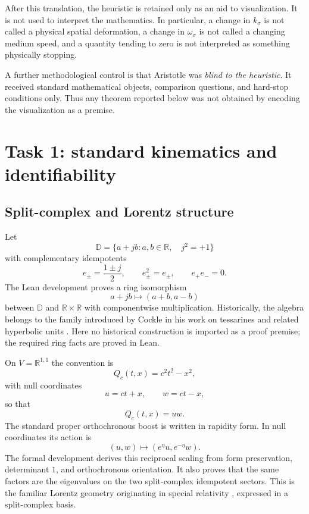 \documentclass[11pt,a4paper]{article}
\newcommand{\R}{\mathbb{R}}
\newcommand{\D}{\mathbb{D}}
\begin{document}
After this translation, the heuristic is retained only as an aid to visualization.  It is not used to interpret the mathematics.  In particular, a change in $k_\sigma$ is not called a physical spatial deformation, a change in $\omega_\sigma$ is not called a changing medium speed, and a quantity tending to zero is not interpreted as something physically stopping.

A further methodological control is that Aristotle was \emph{blind to the heuristic}.  It received standard mathematical objects, comparison questions, and hard-stop conditions only.  Thus any theorem reported below was not obtained by encoding the visualization as a premise.

\section{Task 1: standard kinematics and identifiability}

\subsection{Split-complex and Lorentz structure}

Let
\begin{equation}
\D=\{a+jb:a,b\in\R,\quad j^2=+1\}
\end{equation}
with complementary idempotents
\begin{equation}
 e_\pm=\frac{1\pm j}{2},\qquad e_\pm^2=e_\pm,\qquad e_+e_-=0.
\end{equation}
The Lean development proves a ring isomorphism
\begin{equation}
 a+jb\longmapsto (a+b,a-b)
\end{equation}
between $\D$ and $\R\times\R$ with componentwise multiplication.  Historically, the algebra belongs to the family introduced by Cockle in his work on tessarines and related hyperbolic units \cite{Cockle1849New,Cockle1849Systems}.  Here no historical construction is imported as a proof premise; the required ring facts are proved in Lean.

On $V=\R^{1,1}$ the convention is
\begin{equation}
 Q_c(t,x)=c^2t^2-x^2,
\end{equation}
with null coordinates
\begin{equation}
 u=ct+x,\qquad w=ct-x,
\end{equation}
so that
\begin{equation}
 Q_c(t,x)=uw.
\end{equation}
The standard proper orthochronous boost is written in rapidity form.  In null coordinates its action is
\begin{equation}
 (u,w)\longmapsto(e^{\eta}u,e^{-\eta}w).
\label{eq:nullboost}
\end{equation}
The formal development derives this reciprocal scaling from form preservation, determinant $1$, and orthochronous orientation.  It also proves that the same factors are the eigenvalues on the two split-complex idempotent sectors.  This is the familiar Lorentz geometry originating in special relativity \cite{Einstein1905,Minkowski1909}, expressed in a split-complex basis.
\end{document}
